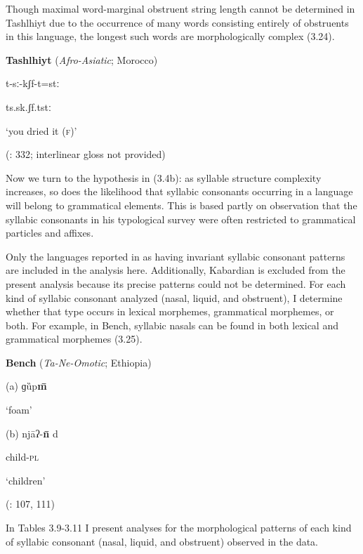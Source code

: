 Though maximal word-marginal obstruent string length cannot be determined in Tashlhiyt due to the occurrence of many words consisting entirely of obstruents in this language, the longest such words are morphologically complex (3.24).

\ea\label{ex:(3.24)}
  \textbf{Tashlhiyt} (\textit{Afro-Asiatic}; Morocco)

t{}-sː{}-kʃf{}-t=stː

ts.sk.ʃf.tstː

‘you dried it (\textsc{f})’

(\citealt{Ridouane2008}: 332; interlinear gloss not provided)

\z

  Now we turn to the hypothesis in (3.4b): as syllable structure complexity increases, so does the likelihood that syllabic consonants occurring in a language will belong to grammatical elements. This is based partly on  observation that the syllabic consonants in his typological survey were often restricted to grammatical particles and affixes.

  Only the languages reported in  as having invariant syllabic consonant patterns are included in the analysis here. Additionally, Kabardian is excluded from the present analysis because its precise patterns could not be determined. For each kind of syllabic consonant analyzed (nasal, liquid, and obstruent), I determine whether that type occurs in lexical morphemes, grammatical morphemes, or both. For example, in Bench, syllabic nasals can be found in both lexical and grammatical morphemes (3.25).

\ea\label{ex:(3.25)}
  \textbf{Bench} (\textit{Ta-Ne-Omotic}; Ethiopia)

(a)   ɡȕp\textbf{m\={} }

‘foam’

(b)   njāʔ{}-\textbf{n\={} }d

child-\textsc{pl}

‘children’

(\citealt{Rapold2006}: 107, 111)

\z

  In Tables 3.9-3.11 I present analyses for the morphological patterns of each kind of syllabic consonant (nasal, liquid, and obstruent) observed in the data.

